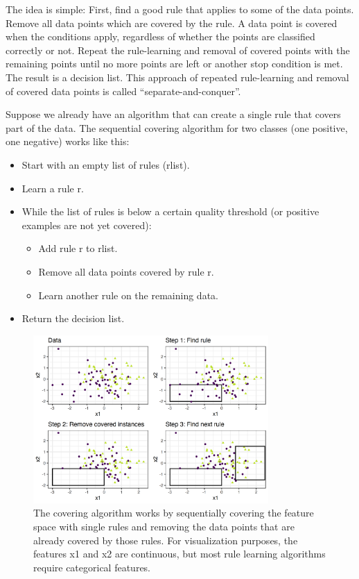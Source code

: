 \documentclass[
  11pt,
]{scrbook}
\providecommand{\tightlist}{%
  \setlength{\itemsep}{0pt}\setlength{\parskip}{0pt}}
\begin{document}
The idea is simple:
First, find a good rule that applies to some of the data points.
Remove all data points which are covered by the rule.
A data point is covered when the conditions apply, regardless of whether the points are classified correctly or not.
Repeat the rule-learning and removal of covered points with the remaining points until no more points are left or another stop condition is met.
The result is a decision list.
This approach of repeated rule-learning and removal of covered data points is called ``separate-and-conquer''.

Suppose we already have an algorithm that can create a single rule that covers part of the data.
The sequential covering algorithm for two classes (one positive, one negative) works like this:

\begin{itemize}
\tightlist
\item
  Start with an empty list of rules (rlist).
\item
  Learn a rule r.
\item
  While the list of rules is below a certain quality threshold (or positive examples are not yet covered):

  \begin{itemize}
  \tightlist
  \item
    Add rule r to rlist.
  \item
    Remove all data points covered by rule r.
  \item
    Learn another rule on the remaining data.
  \end{itemize}
\item
  Return the decision list.
\end{itemize}

\begin{figure}

{\centering \includegraphics[width=0.8\textwidth]{images/covering-algo-1} 

}

\caption{The covering algorithm works by sequentially covering the feature space with single rules and removing the data points that are already covered by those rules. For visualization purposes, the features x1 and x2 are continuous, but most rule learning algorithms require categorical features.}\label{fig:covering-algo}
\end{figure}
\end{document}
